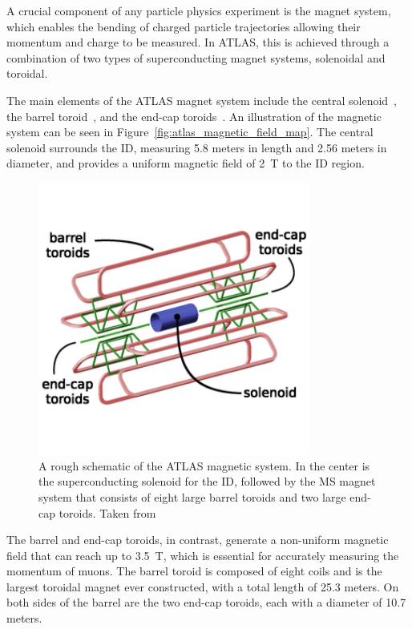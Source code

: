 A crucial component of any particle physics experiment is the magnet system, which enables the bending of charged particle trajectories allowing their momentum and charge to be measured. In ATLAS, this is achieved through a combination of two types of superconducting magnet systems, solenoidal and toroidal.

The main elements of the ATLAS magnet system include the central solenoid~\cite{atlas_central_solenoid}, the barrel toroid~\cite{atlas_barrel_toroid}, and the end-cap toroids~\cite{atlas_endcap_toroid}. An illustration of the magnetic system can be seen in Figure~\ref{fig:atlas_magnetic_field_map}. The central solenoid surrounds the ID, measuring 5.8 meters in length and 2.56 meters in diameter, and provides a uniform magnetic field of 2~T to the ID region.

\begin{figure}
    \centering
    \includegraphics[width=0.8\textwidth]{figures/atlas/atlas_magnetic_system_illustration.png}
    \caption{A rough schematic of the ATLAS magnetic system. In the center is the superconducting solenoid for the ID, followed by the MS magnet system that consists of eight large barrel toroids and two large end-cap toroids. Taken from~\cite{atlas_magnetic_system_illustration}}\label{fig:atlas_magnet_system}
\end{figure}

The barrel and end-cap toroids, in contrast, generate a non-uniform magnetic field that can reach up to 3.5~T, which is essential for accurately measuring the momentum of muons. The barrel toroid is composed of eight coils and is the largest toroidal magnet ever constructed, with a total length of 25.3 meters. On both sides of the barrel are the two end-cap toroids, each with a diameter of 10.7 meters.

